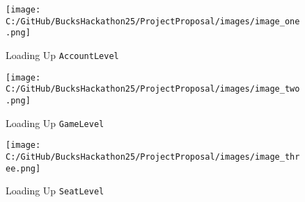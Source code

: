 \documentclass[a4paper]{article}
\begin{document}
\begin{figure}[h!]
    \centering
    \texttt{[image: C:/GitHub/BucksHackathon25/ProjectProposal/images/image\_one.png]}
    \caption{Loading Up \texttt{AccountLevel}}
\end{figure}

\begin{figure}[h!]
    \centering
    \texttt{[image: C:/GitHub/BucksHackathon25/ProjectProposal/images/image\_two.png]}
    \caption{Loading Up \texttt{GameLevel}}
\end{figure}

\begin{figure}[h!]
    \centering
    \texttt{[image: C:/GitHub/BucksHackathon25/ProjectProposal/images/image\_three.png]}
    \caption{Loading Up \texttt{SeatLevel}}
\end{figure}
    
\end{document}
